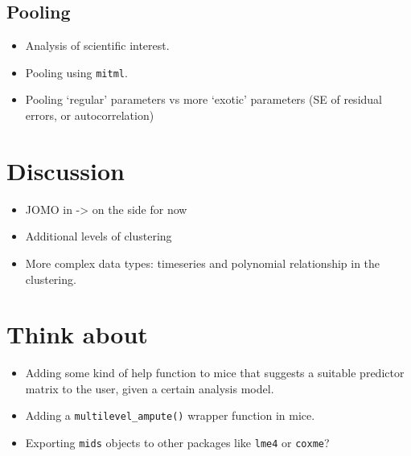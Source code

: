 \documentclass[
]{jss}
\begin{document}
\hypertarget{pooling}{%
\subsection{Pooling}\label{pooling}}

\begin{itemize}
\item
  Analysis of scientific interest.
\item
  Pooling using \texttt{mitml}.
\item
  Pooling `regular' parameters vs more `exotic' parameters (SE of
  residual errors, or autocorrelation)
\end{itemize}

\hypertarget{discussion}{%
\section{Discussion}\label{discussion}}

\begin{itemize}
\item
  JOMO in  -\textgreater{} on the side for now
\item
  Additional levels of clustering
\item
  More complex data types: timeseries and polynomial relationship in the
  clustering.
\end{itemize}

\hypertarget{think-about}{%
\section{Think about}\label{think-about}}

\begin{itemize}
\item
  Adding some kind of help function to mice that suggests a suitable
  predictor matrix to the user, given a certain analysis model.
\item
  Adding a \texttt{multilevel\_ampute()} wrapper function in mice.
\item
  Exporting \texttt{mids} objects to other packages like \texttt{lme4}
  or \texttt{coxme}?
\end{itemize}

\renewcommand\refname{References}

\end{document}

